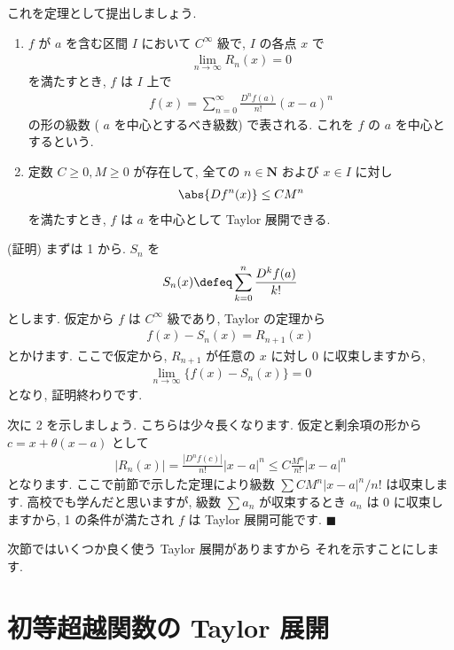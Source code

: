 \documentclass[openany, a4paper, oneside]{jsbook}
\begin{document}
これを定理として提出しましょう.
\begin{thm}[Taylor 展開]
 \begin{enumerate}
  \item $f$ が $a$ を含む区間 $I$ において $C^{\infty}$ 級で,  $I$ の各点 $x$ で
   \begin{align}
    \lim_{n \to \infty}R_n (x)=0
   \end{align}
   を満たすとき,  $f$ は $I$ 上で
   \begin{align}
    f (x)
    =
    \sum_{n=0}^{\infty}\frac{D^n f (a)}{n!}(x-a)^n
   \end{align}
   の形の級数 ( $a$ を中心とするべき級数) で表される.
   これを $f$ の $a$ を中心とするという.
  \item 定数 $C\geq 0,M\geq 0$ が存在して, 全ての $n \in \bm{N}$ および
   $x\in I$ に対し
   \begin{align}
   \abs{Df^n (x)}\leq CM^n
   \end{align}
   を満たすとき,  $f$ は $a$ を中心として Taylor 展開できる.
 \end{enumerate}
\end{thm}
(証明) まずは 1 から.  $S_n$ を
\begin{align}
    S_n (x)\defeq \sum_{k=0}^n \frac{D^k f (a)}{k!}
\end{align}
とします. 仮定から $f$ は $C^{\infty}$ 級であり, Taylor の定理から
\begin{align}
    f (x)-S_n (x)=R_{n+1}(x)
\end{align}
とかけます. ここで仮定から,  $R_{n+1}$ が任意の $x$ に対し $0$ に収束しますから,
\begin{align}
    \lim_{n \to \infty}\{ f (x)-S_n (x) \} =0
\end{align}
となり, 証明終わりです.

次に 2 を示しましょう. こちらは少々長くなります.
仮定と剰余項の形から $c=x+\theta (x-a)$ として
\begin{align}
    |R_n (x)|=\frac{|D^nf (c)|}{n!}|x-a|^n \leq C\frac{M^n}{n!}|x-a|^n
\end{align}
となります. ここで前節で示した定理により級数
 $\sum CM^n|x-a|^n/n!$ は収束します.
高校でも学んだと思いますが,
級数 $\sum a_n$ が収束するとき $a_n$ は 0 に収束しますから, 1 の条件が満たされ
 $f$ は Taylor 展開可能です.  $\blacksquare$

次節ではいくつか良く使う Taylor 展開がありますから
それを示すことにします.
\section{初等超越関数の Taylor 展開}
\end{document}
